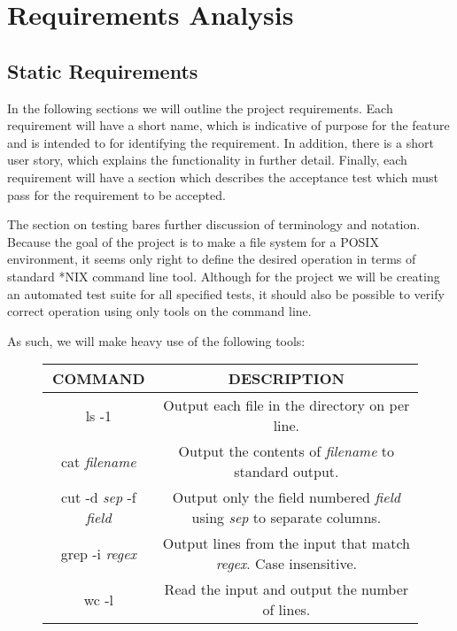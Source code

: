 \section{Requirements Analysis}

\subsection{Static Requirements}

In the following sections we will outline the project requirements. Each
requirement will have a short name, which is indicative of purpose for the
feature and is intended to for identifying the requirement. In addition, there
is a short user story, which explains the functionality in further detail.
Finally, each requirement will have a section which describes the acceptance
test which must pass for the requirement to be accepted.

The section on testing bares further discussion of terminology and notation.
Because the goal of the project is to make a file system for a POSIX
environment, it seems only right to define the desired operation in terms of
standard *NIX command line tool. Although for the project we will be creating an
automated test suite for all specified tests, it should also be possible to
verify correct operation using only tools on the command line.

As such, we will make heavy use of the following tools:

\begin{figure}[H]
\centering
\begin{tabular}{|c|c|}
\hline
COMMAND & DESCRIPTION \\\hline

ls -1 & Output each file in the directory on per line.\\

cat \textit{filename} & Output the contents of \textit{filename} to standard
output.\\

cut -d \textit{sep} -f \textit{field} & Output only the field numbered
\textit{field} using \textit{sep} to separate columns.\\

grep -i \textit{regex} & Output lines from the input that match \textit{regex}.
Case insensitive.\\

wc -l & Read the input and output the number of lines.\\\hline
\end{tabular}
\end{figure}

